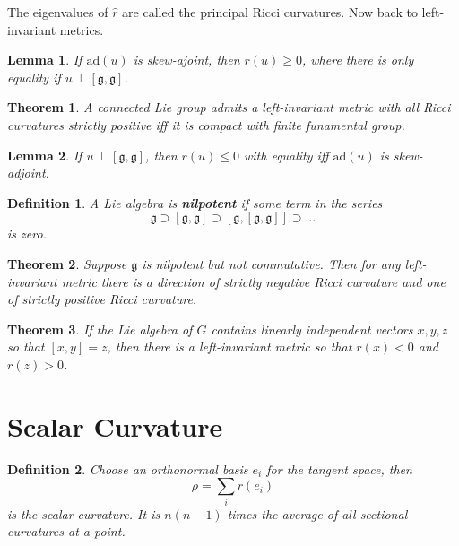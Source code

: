 \documentclass{article}
\newtheorem{thm}{Theorem}
\newtheorem{defn}{Definition}
\newtheorem{lem}{Lemma}
\begin{document}
The eigenvalues of $\widehat{r}$ are called the principal Ricci curvatures. Now back to left-invariant metrics. 
\begin{lem}
If $\mathrm{ad}(u)$ is skew-ajoint, then $r(u) \geq 0$, where there is only equality if $u \perp [\mathfrak{g},\mathfrak{g}]$. 
\end{lem}

\begin{thm}
A connected Lie group admits a left-invariant metric with all Ricci curvatures strictly positive iff it is compact with finite funamental group.
\end{thm}

\begin{lem}
If $u \perp [\mathfrak{g},\mathfrak{g}]$, then $r(u) \leq 0$ with equality iff $\mathrm{ad}(u)$ is skew-adjoint.
\end{lem}

\begin{defn}

A Lie algebra is \textbf{nilpotent} if some term in the series
\begin{equation}
    \mathfrak{g} \supset [\mathfrak{g}, \mathfrak{g}] \supset [\mathfrak{g},[\mathfrak{g},\mathfrak{g}]] \supset \ldots
\end{equation}
is zero.
\end{defn}

\begin{thm}
Suppose $\mathfrak{g}$ is nilpotent but not commutative. Then for any left-invariant metric there is a direction of strictly negative Ricci curvature and one of strictly positive Ricci curvature.
\end{thm}

\begin{thm}

If the Lie algebra of $G$ contains linearly independent vectors $x,y,z$ so that $[x,y]=z$, then there is a left-invariant metric so that $r(x) < 0$ and $r(z) > 0$.
\end{thm}

\section{Scalar Curvature}

\begin{defn}

Choose an orthonormal basis $e_i$ for the tangent space, then 
\begin{equation}
    \rho = \sum_i r(e_i)
\end{equation} is the scalar curvature. It is $n(n-1)$ times the average of all sectional curvatures at a point.
\end{defn}
\end{document}
